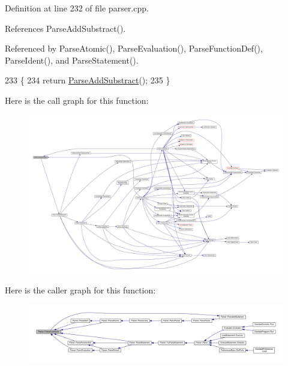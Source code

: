 Definition at line 232 of file parser.\+cpp.



References Parse\+Add\+Substract().



Referenced by Parse\+Atomic(), Parse\+Evaluation(), Parse\+Function\+Def(), Parse\+Ident(), and Parse\+Statement().


\begin{DoxyCode}
233 \{
234     \textcolor{keywordflow}{return} \hyperlink{classParser_a47ba11ddd167c1b0b5cf1d2fd1cf1ccd}{ParseAddSubstract}();
235 \}
\end{DoxyCode}


Here is the call graph for this function\+:
\nopagebreak
\begin{figure}[H]
\begin{center}
\leavevmode
\includegraphics[width=350pt]{d0/d40/classParser_ae46b0a87abe76f40ae117c5bdcb2f29d_cgraph}
\end{center}
\end{figure}




Here is the caller graph for this function\+:
\nopagebreak
\begin{figure}[H]
\begin{center}
\leavevmode
\includegraphics[width=350pt]{d0/d40/classParser_ae46b0a87abe76f40ae117c5bdcb2f29d_icgraph}
\end{center}
\end{figure}


